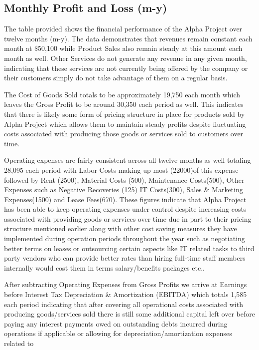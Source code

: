 

\subsection{Monthly Profit and Loss (m-y)}\label{sec:title}


The table provided shows the financial performance of the Alpha Project over twelve months (m-y). The data demonstrates that revenues remain constant each month at \$50,100 while Product Sales also remain steady at this amount each month as well. Other Services do not generate any revenue in any given month, indicating that these services are not currently being offered by the company or their customers simply do not take advantage of them on a regular basis. 

The Cost of Goods Sold totals to be approximately 19,750 each month which leaves the Gross Profit to be around 30,350 each period as well. This indicates that there is likely some form of pricing structure in place for products sold by Alpha Project which allows them to maintain steady profits despite fluctuating costs associated with producing those goods or services sold to customers over time. 

Operating expenses are fairly consistent across all twelve months as well totaling 28,095 each period with Labor Costs making up most (22000)of this expense followed by Rent (2500), Material Costs (500), Maintenance Costs(500), Other Expenses such as Negative Recoveries (125) IT Costs(300), Sales & Marketing Expenses(1500) and Lease Fees(670).  These figures indicate that Alpha Project has been able to keep operating expenses under control despite increasing costs associated with providing goods or services over time due in part to their pricing structure mentioned earlier along with other cost saving measures they have implemented during operation periods throughout the year such as negotiating better terms on leases or outsourcing certain aspects like IT related tasks to third party vendors who can provide better rates than hiring full-time staff members internally would cost them in terms salary/benefits packages etc..  

 After subtracting Operating Expenses from Gross Profits we arrive at Earnings before Interest Tax Depreciation & Amortization (EBITDA) which totals 1,585 each period indicating that after covering all operational costs associated with producing goods/services sold there is still some additional capital left over before paying any interest payments owed on outstanding debts incurred during operations if applicable or allowing for depreciation/amortization expenses related to